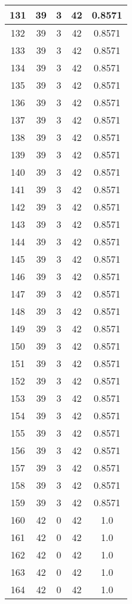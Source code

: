 \documentclass[letterpaper, 12pt]{article}
\begin{document}
\begin{longtable}{|c|c|c|c|c|}
\hline
131 & 39 & 3 & 42 & 0.8571 \\
\hline
132 & 39 & 3 & 42 & 0.8571 \\
\hline
133 & 39 & 3 & 42 & 0.8571 \\
\hline
134 & 39 & 3 & 42 & 0.8571 \\
\hline
135 & 39 & 3 & 42 & 0.8571 \\
\hline
136 & 39 & 3 & 42 & 0.8571 \\
\hline
137 & 39 & 3 & 42 & 0.8571 \\
\hline
138 & 39 & 3 & 42 & 0.8571 \\
\hline
139 & 39 & 3 & 42 & 0.8571 \\
\hline
140 & 39 & 3 & 42 & 0.8571 \\
\hline
141 & 39 & 3 & 42 & 0.8571 \\
\hline
142 & 39 & 3 & 42 & 0.8571 \\
\hline
143 & 39 & 3 & 42 & 0.8571 \\
\hline
144 & 39 & 3 & 42 & 0.8571 \\
\hline
145 & 39 & 3 & 42 & 0.8571 \\
\hline
146 & 39 & 3 & 42 & 0.8571 \\
\hline
147 & 39 & 3 & 42 & 0.8571 \\
\hline
148 & 39 & 3 & 42 & 0.8571 \\
\hline
149 & 39 & 3 & 42 & 0.8571 \\
\hline
150 & 39 & 3 & 42 & 0.8571 \\
\hline
151 & 39 & 3 & 42 & 0.8571 \\
\hline
152 & 39 & 3 & 42 & 0.8571 \\
\hline
153 & 39 & 3 & 42 & 0.8571 \\
\hline
154 & 39 & 3 & 42 & 0.8571 \\
\hline
155 & 39 & 3 & 42 & 0.8571 \\
\hline
156 & 39 & 3 & 42 & 0.8571 \\
\hline
157 & 39 & 3 & 42 & 0.8571 \\
\hline
158 & 39 & 3 & 42 & 0.8571 \\
\hline
159 & 39 & 3 & 42 & 0.8571 \\
\hline
160 & 42 & 0 & 42 & 1.0 \\
\hline
161 & 42 & 0 & 42 & 1.0 \\
\hline
162 & 42 & 0 & 42 & 1.0 \\
\hline
163 & 42 & 0 & 42 & 1.0 \\
\hline
164 & 42 & 0 & 42 & 1.0 \\

\end{longtable}
\end{document}
